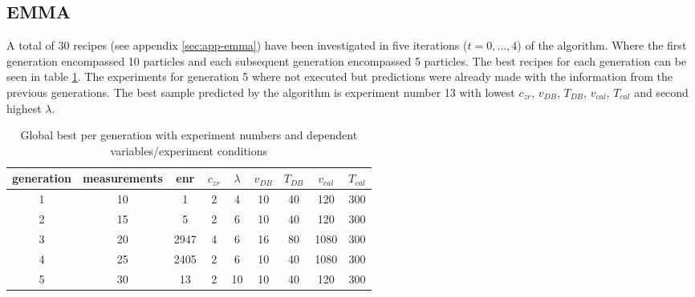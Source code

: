 \subsection{EMMA}
\label{sec:res-emma}
A total of 30 recipes (see appendix \ref{sec:app-emma}) have been investigated in 
five iterations ($t = 0, \dots, 4$) of the algorithm. 
Where the first generation encompassed 10 particles and each subsequent generation encompassed 5 particles. 
The best recipes for each generation can be seen in table \ref{tab:emma-Gb}. 
The experiments for generation 5 where not executed but 
predictions were already made
with the information from the previous generations. 
The best sample predicted by the algorithm is experiment number 13 with 
lowest $c_{zr}$, $v_{DB}$, $T_{DB}$, $v_{cal}$, $T_{cal}$ and second highest $\lambda$. 

\begin{table}[htb]
	\centering
    \caption{Global best per generation with experiment numbers and dependent variables/experiment conditions}
	\label{tab:emma-Gb}
	\begin{tabular}{ccccccccc}
        \hline\hline
		generation& measurements &enr &$c_{zr}$ &$\lambda$ &$v_{DB}$ &$T_{DB}$ &$v_{cal}$ &$T_{cal}$\\
        \hline
	1  &10	&1       &2    &4   &10   &40  &120  &300\\
	2  &15	&5       &2    &6   &10   &40  &120  &300\\
	3  &20	&2947    &4    &6   &16   &80 &1080  &300\\
	4  &25	&2405    &2    &6   &10   &40 &1080  &300\\
	5  &30	&13      &2   &10   &10   &40  &120  &300\\
    \hline\hline
	\end{tabular}
\end{table}

